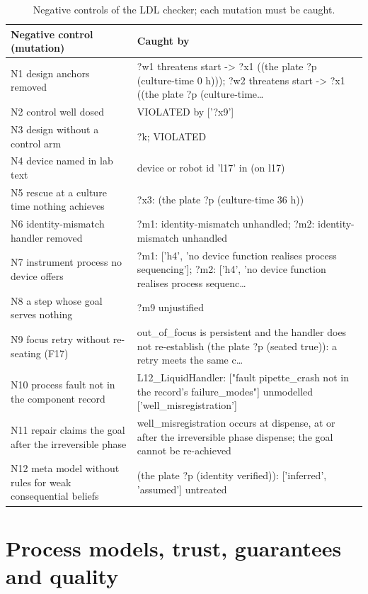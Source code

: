 \documentclass[10pt,a4paper]{article}
\begin{document}
\begin{table}[tbp]\centering\footnotesize
\caption{Negative controls of the LDL checker; each mutation must be caught.}\label{tab:ldlneg}
\begin{tabularx}{\linewidth}{p{5cm}X}\toprule
\textbf{Negative control (mutation)} & \textbf{Caught by} \\\midrule
N1 design anchors removed & ?w1 threatens start -> ?x1 ((the plate ?p (culture-time 0 h))); ?w2 threatens start -> ?x1 ((the plate ?p (culture-time… \\
N2 control well dosed & VIOLATED by ['?x9'] \\
N3 design without a control arm & ?k; VIOLATED \\
N4 device named in lab text & device or robot id 'l17' in (on l17) \\
N5 rescue at a culture time nothing achieves & ?x3: (the plate ?p (culture-time 36 h)) \\
N6 identity-mismatch handler removed & ?m1: identity-mismatch unhandled; ?m2: identity-mismatch unhandled \\
N7 instrument process no device offers & ?m1: ['h4', 'no device function realises process sequencing']; ?m2: ['h4', 'no device function realises process sequenc… \\
N8 a step whose goal serves nothing & ?m9 unjustified \\
N9 focus retry without re-seating (F17) & out\_\allowbreak{}of\_\allowbreak{}focus is persistent and the handler does not re-establish (the plate ?p (seated true)): a retry meets the same c… \\
N10 process fault not in the component record & L12\_\allowbreak{}LiquidHandler: ["fault pipette\_\allowbreak{}crash not in the record's failure\_\allowbreak{}modes"] unmodelled ['well\_\allowbreak{}misregistration'] \\
N11 repair claims the goal after the irreversible phase & well\_\allowbreak{}misregistration occurs at dispense, at or after the irreversible phase dispense; the goal cannot be re-achieved \\
N12 meta model without rules for weak consequential beliefs & (the plate ?p (identity verified)): ['inferred', 'assumed'] untreated \\\bottomrule
\end{tabularx}
\end{table}

\section{Process models, trust, guarantees and quality}\label{sec:trust}
\end{document}
